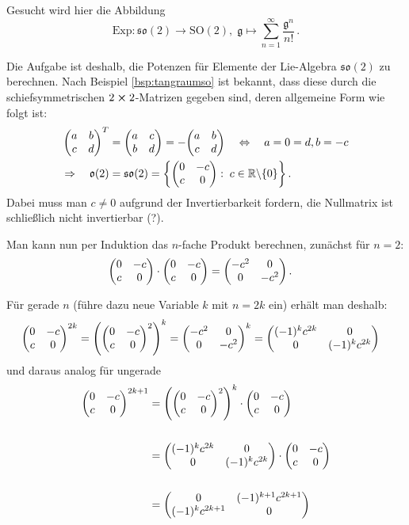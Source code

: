 \documentclass[../H_Analysis_main.tex]{subfiles}
\begin{document}
\begin{bsp}
Gesucht wird hier die Abbildung
\begin{equation*}
\text{Exp}: \mathfrak{so}(2) \rightarrow \text{SO}(2), \; \mathfrak{g} \mapsto \sum_{n = 1}^\infty \frac{\mathfrak{g}^n}{n!} \, .
\end{equation*}

Die Aufgabe ist deshalb, die Potenzen für Elemente der Lie-Algebra $\mathfrak{so}(2)$ zu berechnen. Nach Beispiel \ref{bsp:tangraumso} ist bekannt, dass diese durch die schiefsymmetrischen $2 \cross 2$-Matrizen gegeben sind, deren allgemeine Form wie folgt ist:
\begin{align}
\mqty(a & b \\ c & d)^T &= \mqty( a & c \\ b & d) = - \mqty(a & b \\ c & d) \quad \Leftrightarrow \quad a = 0 = d, b = -c
\notag\\
\Rightarrow \quad \mathfrak{o}(2) &= \mathfrak{so}(2) = \qty{\mqty(0 & -c \\ c & 0): \; c \in \mathbb{R}\backslash\qty{0}} \, .
\end{align}
Dabei muss man $c \neq 0$ aufgrund der Invertierbarkeit fordern, die Nullmatrix ist schließlich nicht invertierbar (?).

Man kann nun per Induktion das $n$-fache Produkt berechnen, zunächst für $n = 2$:%
\begin{align*}
\mqty(0 & -c \\ c & 0) \cdot \mqty(0 & -c \\ c & 0) &= \mqty(-c^2 & 0 \\ 0 & -c^2) \, .
\end{align*}

Für gerade $n$ (führe dazu neue Variable $k$ mit $n = 2k$ ein) erhält man deshalb:
\begin{align}
\mqty(0 & -c \\ c & 0)^{2k} &= \qty(\mqty(0 & -c \\ c & 0)^2)^k = \mqty(-c^2 & 0 \\ 0 & -c^2)^k = \mqty( (-1)^k c^{2k} & 0 \\ 0 & (-1)^k c^{2k})
\end{align}
und daraus analog für ungerade
\begin{align}
\mqty(0 & -c \\ c & 0)^{2k + 1} &= \qty(\mqty(0 & -c \\ c & 0)^2)^k \cdot \mqty(0 & -c \\ c & 0)
\notag\\
\notag\\
&= \mqty( (-1)^k c^{2k} & 0 \\ 0 & (-1)^k c^{2k}) \cdot \mqty(0 & -c \\ c & 0)
\notag\\
\notag\\
&= \mqty(0 & (-1)^{k + 1} c^{2k + 1} \\ (-1)^k c^{2k + 1}  & 0)
\end{align}


\end{bsp}
\end{document}
